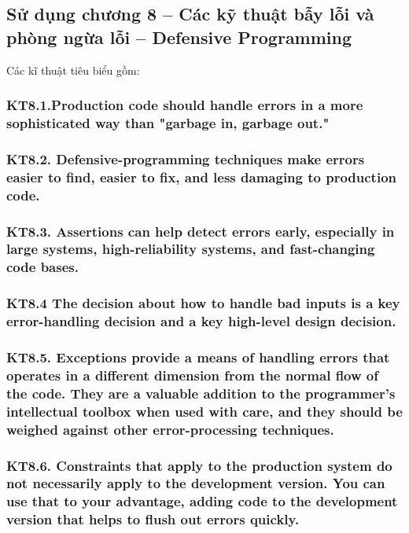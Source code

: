 \documentclass[12pt]{report}
\begin{document}
\subsection{Sử dụng chương 8 – Các kỹ thuật bẫy lỗi và phòng ngừa lỗi -- Defensive Programming}
\noindent Các kĩ thuật tiêu biểu gồm:

\subsubsection{KT8.1.Production code should handle errors in a more sophisticated way than "garbage in, garbage out."}

\subsubsection{KT8.2. Defensive-programming techniques make errors easier to find, easier to fix, and less damaging to production code.}

\subsubsection{KT8.3. Assertions can help detect errors early, especially in large systems, high-reliability systems, and fast-changing code bases.}

\subsubsection{KT8.4 The decision about how to handle bad inputs is a key error-handling decision and a key high-level design decision.}

\subsubsection{KT8.5. Exceptions provide a means of handling errors that operates in a different dimension from the normal flow of the code. They are a valuable addition to the programmer's intellectual toolbox when used with care, and they should be weighed against other error-processing techniques.}

\subsubsection{KT8.6. Constraints that apply to the production system do not necessarily apply to the development version. You can use that to your advantage, adding code to the development version that helps to flush out errors quickly.}
\end{document}
